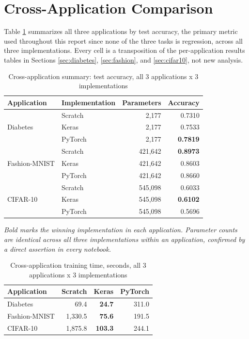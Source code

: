 \documentclass[11pt]{article}
\begin{document}
\newpage
\section{Cross-Application Comparison}
\label{sec:cross}

Table \ref{tab:cross-app} summarizes all three applications by test accuracy,
the primary metric used throughout this report since none of the three tasks
is regression, across all three implementations. Every cell is a
transposition of the per-application results tables in Sections
\ref{sec:diabetes}, \ref{sec:fashion}, and \ref{sec:cifar10}, not new
analysis.

\begin{table}[H]
\centering
\caption{Cross-application summary: test accuracy, all 3 applications x 3 implementations}
\label{tab:cross-app}
\begin{tabular}{llrr}
\toprule
Application & Implementation & Parameters & Accuracy \\
\midrule
\multirow{3}{*}{Diabetes}
  & Scratch & 2,177 & 0.7310 \\
  & Keras & 2,177 & 0.7533 \\
  & PyTorch & 2,177 & \textbf{0.7819} \\
\midrule
\multirow{3}{*}{Fashion-MNIST}
  & Scratch & 421,642 & \textbf{0.8973} \\
  & Keras & 421,642 & 0.8603 \\
  & PyTorch & 421,642 & 0.8660 \\
\midrule
\multirow{3}{*}{CIFAR-10}
  & Scratch & 545,098 & 0.6033 \\
  & Keras & 545,098 & \textbf{0.6102} \\
  & PyTorch & 545,098 & 0.5696 \\
\bottomrule
\end{tabular}
\end{table}

\noindent\textit{Bold marks the winning implementation in each application.
Parameter counts are identical across all three implementations within an
application, confirmed by a direct assertion in every notebook.}

\begin{table}[H]
\centering
\caption{Cross-application training time, seconds, all 3 applications x 3 implementations}
\label{tab:cross-time}
\begin{tabular}{lrrr}
\toprule
Application & Scratch & Keras & PyTorch \\
\midrule
Diabetes & 69.4 & \textbf{24.7} & 311.0 \\
Fashion-MNIST & 1,330.5 & \textbf{75.6} & 191.5 \\
CIFAR-10 & 1,875.8 & \textbf{103.3} & 244.1 \\
\bottomrule
\end{tabular}
\end{table}
\end{document}

